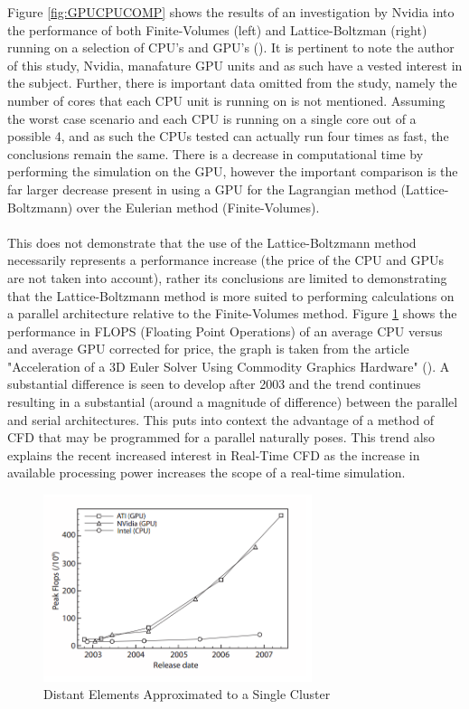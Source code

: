 Figure \ref{fig:GPUCPUCOMP} shows the results of an investigation by Nvidia into the performance of both Finite-Volumes (left) and Lattice-Boltzman (right) running on a selection of CPU's and GPU's (\cite{computational_fluid_dynamics_nvidia}). It is pertinent to note the author of this study, Nvidia, manafature GPU units and as such have a vested interest in the subject. Further, there is important data omitted from the study, namely the number of cores that each CPU unit is running on is not mentioned. Assuming the worst case scenario and each CPU is running on a single core out of a possible 4, and as such the CPUs tested can actually run four times as fast, the conclusions remain the same. There is a decrease in computational time by performing the simulation on the GPU, however the important comparison is the far larger decrease present in using a GPU for the Lagrangian method (Lattice-Boltzmann) over the Eulerian method (Finite-Volumes). 
\\\\
This does not demonstrate that the use of the Lattice-Boltzmann method necessarily represents a performance increase (the price of the CPU and GPUs are not taken into account), rather its conclusions are limited to demonstrating that the Lattice-Boltzmann method is more suited to performing calculations on a parallel architecture relative to the Finite-Volumes method. Figure \ref{fig:GPUCPUPERF} shows the performance in FLOPS (Floating Point Operations) of an average CPU versus and average GPU corrected for price, the graph is taken from the article "Acceleration of a 3D Euler Solver Using Commodity
Graphics Hardware" (\cite{brandvik_pullan_2008}). A substantial difference is seen to develop after 2003 and the trend continues resulting in a substantial (around a magnitude of difference) between the parallel and serial architectures. This puts into context the advantage of a method of CFD that may be programmed for a parallel naturally poses. This trend also explains the recent increased interest in Real-Time CFD as the increase in available processing power increases the scope of a real-time simulation.

\begin{figure}[H]
\begin{center}
\includegraphics[width=0.7\textwidth]{Referenced_Figures/CPUGPU-Performance.png}
\caption{\label{fig:GPUCPUPERF}Distant Elements Approximated to a Single Cluster}
\end{center}
\end{figure}

